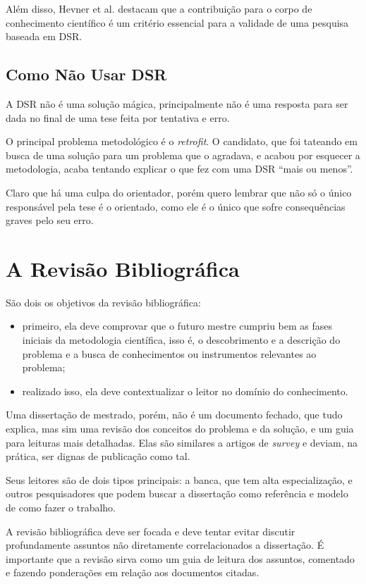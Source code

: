 Além disso, Hevner et al. \cite{hevner2004design} destacam que a contribuição para o corpo de conhecimento científico é um critério essencial para a validade de uma pesquisa baseada em DSR.

\subsection{Como Não Usar  DSR}

A DSR não é uma solução mágica, principalmente não é uma resposta para ser dada no final de uma tese feita por tentativa e erro. 

O principal problema metodológico é o \textit{retrofit}. O candidato, que foi tateando em busca de uma solução para um problema que o agradava, e acabou por esquecer a metodologia, acaba tentando explicar o que fez com uma DSR ``mais ou menos''.

Claro que há uma culpa do orientador, porém quero lembrar que não só o único responsável pela tese é o orientado, como ele é o único que sofre consequências graves pelo seu erro.



\section{A Revisão Bibliográfica}


São dois os objetivos da revisão bibliográfica:
\begin{itemize}
    \item primeiro, ela deve comprovar que o futuro mestre cumpriu bem as fases iniciais da metodologia científica, isso é, o descobrimento e a descrição do problema e a busca de conhecimentos ou instrumentos relevantes ao problema;
    \item realizado isso, ela deve contextualizar o leitor no domínio do conhecimento. 
\end{itemize}

Uma dissertação de mestrado, porém, não é um documento fechado, que tudo explica, mas sim uma revisão dos conceitos do problema e da solução, e um guia para leituras mais detalhadas. 
Elas são similares a artigos de \textit{survey} e deviam, na prática, ser dignas de publicação como tal.

Seus leitores são de dois tipos principais: a banca, que tem alta especialização, e outros pesquisadores que podem buscar a dissertação como referência e modelo de como fazer o trabalho.

A revisão bibliográfica deve ser focada e deve tentar evitar discutir profundamente assuntos não diretamente correlacionados a dissertação.
É importante que a revisão sirva como um guia de leitura dos assuntos, comentado e fazendo ponderações em relação aos documentos citadas.

